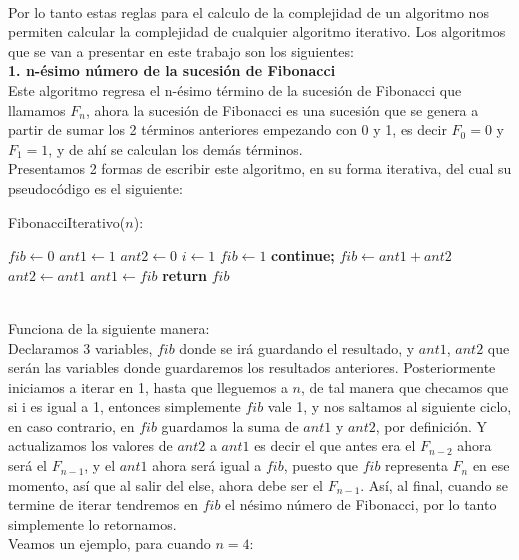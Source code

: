\documentclass[12pt,twoside]{article}
\begin{document}
\\ Por lo tanto estas reglas para el calculo de la complejidad de un algoritmo nos permiten calcular la complejidad de cualquier algoritmo iterativo.
\newpage
Los algoritmos que se van a presentar en este trabajo son los siguientes:
\\ \textbf{1. n-ésimo número de la sucesión de Fibonacci}
\\ Este algoritmo regresa el n-ésimo término de la sucesión de Fibonacci que llamamos $F_n$, ahora la sucesión de Fibonacci es una sucesión que se genera a partir de sumar los 2 términos anteriores empezando con 0 y 1, es decir $F_0 = 0$ y $F_1=1$, y de ahí se calculan los demás términos.
\\ Presentamos 2 formas de escribir este algoritmo, en su forma iterativa, del cual su pseudocódigo es el siguiente:
\begin{algorithm}
    \caption{FibonacciIterativo($n$):}
    \begin{algorithmic}
        \State $fib \gets 0$
        \State $ant1 \gets 1$
        \State $ant2 \gets 0$
        \State $i \gets 1$
                \State $fib \gets 1$
                \State \textbf{continue;}
            \Else
                \State $fib \gets ant1+ant2$
                \State $ant2 \gets ant1$
                \State $ant1 \gets fib$
            \EndIf 
        \EndFor
        \State \textbf{return} $fib$
    \end{algorithmic}
\end{algorithm}
\\ Funciona de la siguiente manera:
\\ Declaramos 3 variables, $fib$ donde se irá guardando el resultado, y $ant1$, $ant2$ que serán las variables donde guardaremos los resultados anteriores. Posteriormente iniciamos a iterar en 1, hasta que lleguemos a $n$, de tal manera que checamos que si i es igual a 1, entonces simplemente $fib$ vale 1, y nos saltamos al siguiente ciclo, en caso contrario, en $fib$ guardamos la suma de $ant1$ y $ant2$, por definición. Y actualizamos los valores de $ant2$ a $ant1$ es decir el que antes era el $F_{n-2}$ ahora será el $F_{n-1}$, y el $ant1$ ahora será igual a $fib$, puesto que $fib$ representa $F_n$ en ese momento, así que al salir del else, ahora debe ser el $F_{n-1}$. Así, al final, cuando se termine de iterar tendremos en $fib$ el nésimo número de Fibonacci, por lo tanto simplemente lo retornamos.
\newline
\\ Veamos un ejemplo, para cuando $n=4$:
\end{document}
